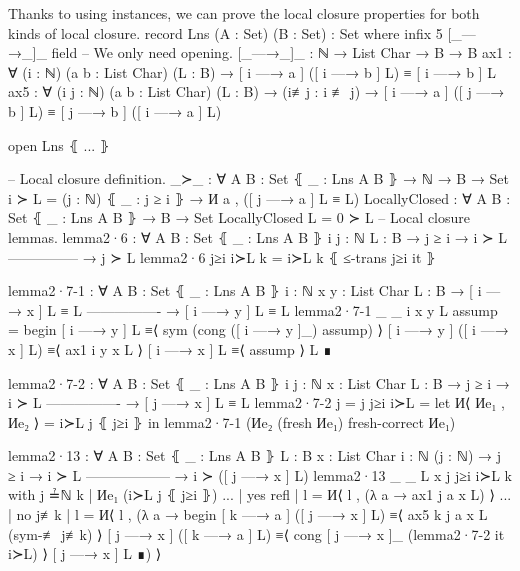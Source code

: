 \documentclass[logo,bsc,singlespacing,parskip,online]{infthesis}
\renewenvironment{code}{\mintedcopy[breaklines,breaksymbolleft=\;]{agda}}{\endmintedcopy}
\begin{document}
Thanks to using instances, we can prove the local closure properties for both kinds of local
closure.
\begin{code}
  record Lns (A : Set) (B : Set) : Set where
    infix 5 [_—→_]_
    field
      -- We only need opening.
      [_—→_]_ : ℕ → List Char → B → B
      ax1 : ∀ (i : ℕ) (a b : List Char) (L : B)
        → [ i —→ a ] ([ i —→ b ] L) ≡ [ i —→ b ] L
      ax5 : ∀ (i j : ℕ) (a b : List Char) (L : B)
        → (i≢j : i ≢ j)
        → [ i —→ a ] ([ j —→ b ] L) ≡ [ j —→ b ] ([ i —→ a ] L)

  open Lns ⦃ ... ⦄

  
  -- Local closure definition.
  _≻_ : ∀ {A B : Set} ⦃ _ : Lns A B ⦄ → ℕ → B → Set
  i ≻ L = (j : ℕ) ⦃ _ : j ≥ i ⦄ → И a , ([ j —→ a ] L ≡ L)
  LocallyClosed : ∀ {A B : Set} ⦃ _ : Lns A B ⦄ → B → Set
  LocallyClosed L = 0 ≻ L
  -- Local closure lemmas.
  lemma2·6 : ∀ {A B : Set} ⦃ _ : Lns A B ⦄ {i j : ℕ} {L : B}
    → j ≥ i   → i ≻ L
      ---------------
    → j ≻ L
  lemma2·6 j≥i i≻L k = i≻L k ⦃ ≤-trans j≥i it ⦄

  lemma2·7-1 : ∀ {A B : Set} ⦃ _ : Lns A B ⦄ {i : ℕ} {x y : List Char} {L : B}
    → [ i —→ x ] L ≡ L
      ----------------
    → [ i —→ y ] L ≡ L
  lemma2·7-1 {_} {_} {i} {x} {y} {L} assump =
    begin
      [ i —→ y ] L
    ≡⟨ sym (cong ([ i —→ y ]_) assump) ⟩
      [ i —→ y ] ([ i —→ x ] L)
    ≡⟨ ax1 i y x L ⟩
      [ i —→ x ] L
    ≡⟨ assump ⟩
      L
    ∎

  lemma2·7-2 : ∀ {A B : Set} ⦃ _ : Lns A B ⦄ {i j : ℕ} {x : List Char} {L : B}
    → j ≥ i → i ≻ L
      ----------------
    → [ j —→ x ] L ≡ L
  lemma2·7-2 {j = j} j≥i i≻L =
    let И⟨ Иe₁ , Иe₂ ⟩ = i≻L j ⦃ j≥i ⦄ in
      lemma2·7-1 (Иe₂ (fresh Иe₁) {fresh-correct Иe₁})

  lemma2·13 : ∀ {A B : Set} ⦃ _ : Lns A B ⦄ {L : B} {x : List Char} {i : ℕ} (j : ℕ)
    → j ≥ i      → i ≻ L
      ------------------
    → i ≻ ([ j —→ x ] L)
  lemma2·13 {_} {_} {L} {x} j j≥i i≻L k
    with j ≟ℕ k | Иe₁ (i≻L j ⦃ j≥i ⦄)
  ... | yes refl | l = И⟨ l , (λ a → ax1 j a x L) ⟩
  ... | no  j≢k  | l = И⟨ l , (λ a → 
    begin
      [ k —→ a ] ([ j —→ x ] L)
    ≡⟨ ax5 k j a x L (sym-≢ j≢k) ⟩
      [ j —→ x ] ([ k —→ a ] L)
    ≡⟨ cong [ j —→ x ]_ (lemma2·7-2 it i≻L) ⟩
      [ j —→ x ] L
    ∎) ⟩


\end{code}
\end{document}

